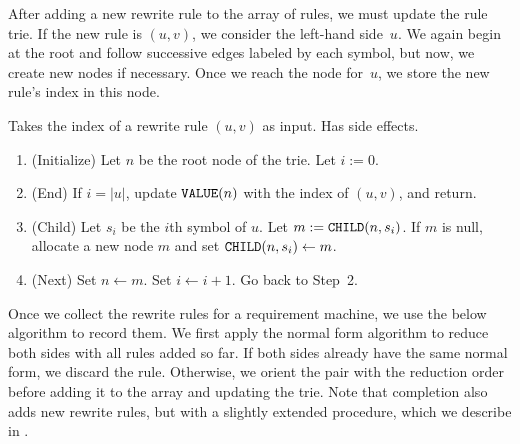 \documentclass[../generics]{subfiles}
\begin{document}
After adding a new rewrite rule to the array of rules, we must update the rule trie. If the new rule is $(u,v)$, we consider the left-hand side~$u$. We again begin at the root and follow successive edges labeled by each symbol, but now, we create new nodes if necessary. Once we reach the node for~$u$, we store the new rule's index in this node.

\begin{algorithm}\label{trie insert algo}
Takes the index of a rewrite rule $(u,v)$ as input. Has side effects.
\begin{enumerate}
\item (Initialize) Let $n$ be the root node of the trie. Let $i:=0$.
\item (End) If $i=|u|$, update $\texttt{VALUE}(n)$ with the index of $(u,v)$, and return.
\item (Child) Let $s_i$ be the $i$th symbol of $u$. Let $m:=\texttt{CHILD}(n,s_i)$. If $m$ is null, allocate a new node $m$ and set $\texttt{CHILD}(n,s_i)\leftarrow m$.
\item (Next) Set $n \leftarrow m$. Set $i \leftarrow i+1$. Go back to Step~2.
\end{enumerate}
\end{algorithm}

Once we collect the rewrite rules for a requirement machine, we use the below algorithm to record them. We first apply the normal form algorithm to reduce both sides with all rules added so far. If both sides already have the same normal form, we discard the rule. Otherwise, we orient the pair with the reduction order before adding it to the array and updating the trie. Note that completion also adds new rewrite rules, but with a slightly extended procedure, which we describe in .
\end{document}
